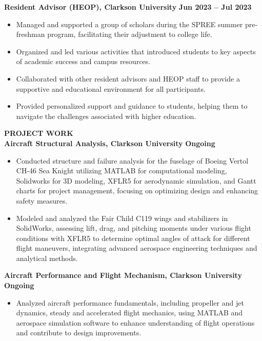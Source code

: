 \documentclass{article}
\begin{document}
\noindent \textbf{Resident Advisor (HEOP), Clarkson University} \hfill \textbf{Jun 2023 – Jul 2023}
\begin{itemize}[noitemsep,nolistsep,leftmargin=*]
\item {\small Managed and supported a group of scholars during the SPREE summer pre-freshman program, facilitating their adjustment to college life.}
\item {\small Organized and led various activities that introduced students to key aspects of academic success and campus resources.}
\item {\small Collaborated with other resident advisors and HEOP staff to provide a supportive and educational environment for all participants.}
\item {\small Provided personalized support and guidance to students, helping them to navigate the challenges associated with higher education.}\\
\end{itemize}


%
%


\noindent \textbf{PROJECT WORK} \\
\noindent \textbf{Aircraft Structural Analysis, Clarkson University} \hfill \textbf{Ongoing}
\begin{itemize}[noitemsep,nolistsep,leftmargin=*]
\item {\small Conducted structure and failure analysis for the fuselage of Boeing Vertol CH-46 Sea Knight utilizing MATLAB for computational modeling, Solidworks for 3D modeling, XFLR5 for aerodynamic simulation, and Gantt charts for project management, focusing on optimizing design and enhancing safety measures.}
\item {\small Modeled and analyzed the Fair Child C119 wings and stabilizers in SolidWorks, assessing lift, drag, and pitching moments under various flight conditions with XFLR5 to determine optimal angles of attack for different flight maneuvers, integrating advanced aerospace engineering techniques and analytical methods.}
\end{itemize}

\noindent \textbf{Aircraft Performance and Flight Mechanism, Clarkson University} \hfill \textbf{Ongoing}
\begin{itemize}[noitemsep,nolistsep,leftmargin=*]
\item {\small Analyzed aircraft performance fundamentals, including propeller and jet dynamics, steady and accelerated flight mechanics, using MATLAB and aerospace simulation software to enhance understanding of flight operations and contribute to design improvements.}
\end{itemize}
\end{document}
